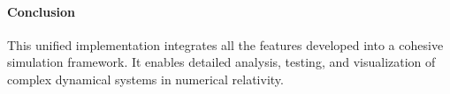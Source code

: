 \documentclass[12pt]{article}
\begin{document}
\paragraph{Conclusion}
This unified implementation integrates all the features developed into a cohesive simulation framework. It enables detailed analysis, testing, and visualization of complex dynamical systems in numerical relativity.





\end{document}
